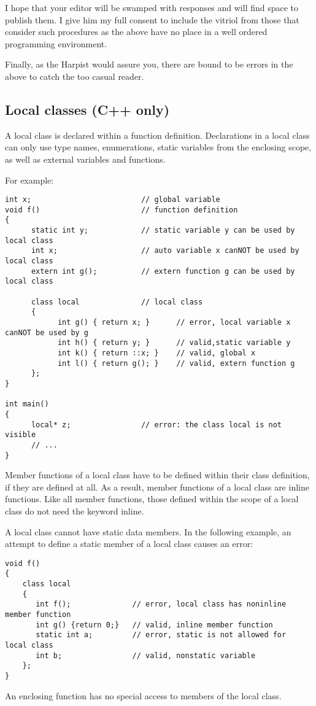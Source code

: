 \documentclass{book}
\begin{document}
I hope that your editor will be swamped with responses and will find space to publish them. 
I give him my full consent to include the vitriol from those that consider such procedures as the above have no place in a well ordered programming environment.

Finally, as the Harpist would assure you, there are bound to be errors in the above to catch the too casual reader.
\subsection{ Local classes (C++ only)}

A local class is declared within a function definition. 
Declarations in a local class can only use type names, enumerations, static variables from the enclosing scope, as well as external variables and functions.

For example:
\begin{lstlisting}
int x;                         // global variable
void f()                       // function definition
{
      static int y;            // static variable y can be used by local class
      int x;                   // auto variable x canNOT be used by  local class
      extern int g();          // extern function g can be used by  local class

      class local              // local class
      {
            int g() { return x; }      // error, local variable x  canNOT be used by g
            int h() { return y; }      // valid,static variable y
            int k() { return ::x; }    // valid, global x
            int l() { return g(); }    // valid, extern function g
      };
}

int main()
{
      local* z;                // error: the class local is not visible
      // ...
}
\end{lstlisting}
Member functions of a local class have to be defined within their class definition, if they are defined at all. 
As a result, member functions of a local class are inline functions. Like all member functions, those defined within the scope of a local class do not need the keyword inline.

A local class cannot have static data members. In the following example, an attempt to define a static member of a local class causes an error:

\begin{lstlisting}
void f()
{
    class local
    {
       int f();              // error, local class has noninline  member function
       int g() {return 0;}   // valid, inline member function
       static int a;         // error, static is not allowed for  local class
       int b;                // valid, nonstatic variable
    };
}
\end{lstlisting}
An enclosing function has no special access to members of the local class.
\end{document}
